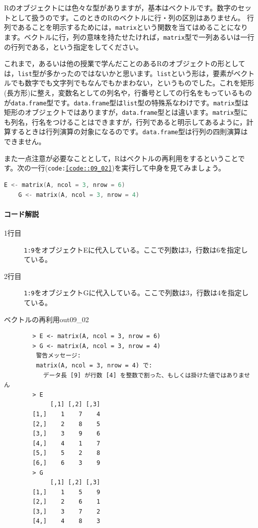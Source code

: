 \documentclass{ltjsbook}
\begin{document}
Rのオブジェクトには色々な型がありますが，基本はベクトルです。数字のセットとして扱うのです。このときのRのベクトルに行・列の区別はありません。
行列であることを明示するためには，\texttt{matrix}という関数を当てはめることになります。ベクトルに行，列の意味を持たせたければ，\texttt{matrix}型で一列あるいは一行の行列である，という指定をしてください。

これまで，あるいは他の授業で学んだことのあるRのオブジェクトの形としては，\texttt{list}型が多かったのではないかと思います。\texttt{list}という形は，要素がベクトルでも数字でも文字列でもなんでもかまわない，というものでした。これを矩形(長方形)に整え，変数名としての列名や，行番号としての行名をもっているものが\texttt{data.frame}型です。\texttt{data.frame}型は\texttt{list}型の特殊系なわけです。\texttt{matrix}型は矩形のオブジェクトではありますが，\texttt{data.frame}型とは違います。\texttt{matrix}型にも列名，行名をつけることはできますが，行列であると明示してあるように，計算するときは行列演算の対象になるのです。\texttt{data.frame}型は行列の四則演算はできません。

また一点注意が必要なこととして，Rはベクトルの再利用をするということです。次の一行(\texttt{code:\ref{code::09_02}})を実行して中身を見てみましょう。

\begin{lstlisting}[language=c++,label={code::09_02},caption={ベクトルデータの保持}]
    E <- matrix(A, ncol = 3, nrow = 6)
    G <- matrix(A, ncol = 3, nrow = 4)
\end{lstlisting}
\paragraph{コード解説}
\begin{description}
    \item[1行目] \texttt{1:9}をオブジェクトEに代入している。ここで列数は3，行数は6を指定している。
    \item[2行目] \texttt{1:9}をオブジェクトGに代入している。ここで列数は3，行数は4を指定している。
\end{description}

\begin{Rscreen}{ベクトルの再利用}{out09_02}
    \begin{verbatim}
        > E <- matrix(A, ncol = 3, nrow = 6)
        > G <- matrix(A, ncol = 3, nrow = 4)
         警告メッセージ: 
         matrix(A, ncol = 3, nrow = 4) で: 
           データ長 [9] が行数 [4] を整数で割った、もしくは掛けた値ではありません 
        > E
             [,1] [,2] [,3]
        [1,]    1    7    4
        [2,]    2    8    5
        [3,]    3    9    6
        [4,]    4    1    7
        [5,]    5    2    8
        [6,]    6    3    9
        > G
             [,1] [,2] [,3]
        [1,]    1    5    9
        [2,]    2    6    1
        [3,]    3    7    2
        [4,]    4    8    3
\end{verbatim}
\end{Rscreen}
\end{document}
